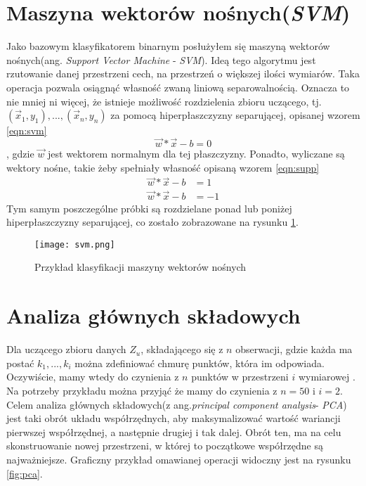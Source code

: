 \section{Maszyna wektorów nośnych(\textit{SVM})}

Jako bazowym klasyfikatorem binarnym posłużyłem się maszyną wektorów nośnych(ang. \textit{Support Vector Machine} - \textit{SVM}). Ideą tego algorytmu jest rzutowanie danej przestrzeni cech, na przestrzeń o większej ilości wymiarów. Taka operacja pozwala osiągnąć własność zwaną liniową separowalnością. Oznacza to nie mniej ni więcej, że istnieje możliwość rozdzielenia zbioru uczącego, tj. ${(\vec{x}_{1},y_{1}),...,(\vec{x}_{n},y_{n})}$ za pomocą hiperpłaszczyzny separującej, opisanej wzorem \ref{eqn:svm}
\begin{equation}
	\vec{w} * \vec{x}-b=0
	\label{eqn:svm}
\end{equation}
, gdzie $\vec{w}$ jest wektorem normalnym dla tej płaszczyzny. Ponadto, wyliczane są wektory nośne, takie żeby spełniały własność opisaną wzorem \ref{eqn:supp}
\begin{equation}
	\begin{split}
		\vec{w} * \vec{x}-b &=1 \\
		\vec{w} * \vec{x}-b &=-1
	\end{split}
	\label{eqn:supp}
\end{equation}
Tym samym poszczególne próbki są rozdzielane ponad lub poniżej hiperpłaszczyzny separującej, co zostało zobrazowane na rysunku \ref{fig:svm}.
\begin{figure}[h!]
	\texttt{[image: svm.png]}
	\centering
	\caption{Przykład klasyfikacji maszyny wektorów nośnych}
	\label{fig:svm}
\end{figure}

\section{Analiza głównych składowych}

Dla uczącego zbioru danych $Z_{u}$, składającego się z $n$ obserwacji, gdzie każda ma postać ${k_{1}, ..., k_{i}}$ można zdefiniować chmurę punktów, która im odpowiada. Oczywiście, mamy wtedy do czynienia z $n$ punktów w przestrzeni $i$ wymiarowej \cite{pca}. Na potrzeby przykładu można przyjąć że mamy do czynienia z $n=50$ i $i=2$. Celem analiza głównych składowych(z ang.\textit{principal component analysis}- \textit{PCA}) jest taki obrót układu współrzędnych, aby maksymalizować wartość wariancji pierwszej współrzędnej, a następnie drugiej i tak dalej. Obrót ten, ma na celu skonstruowanie nowej przestrzeni, w której to początkowe współrzędne są najważniejsze. Graficzny przykład omawianej operacji widoczny jest na rysunku \ref{fig:pca}.

